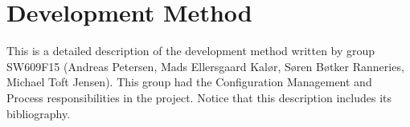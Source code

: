 \chapter{Development Method}\label{app:dev_method}

This is a detailed description of the \giraf development method written by group SW609F15 (Andreas Petersen, Mads Ellersgaard Kal\o r, S\o ren B\o tker Ranneries, Michael Toft Jensen). This group had the Configuration Management and Process responsibilities in the \giraf project. Notice that this description includes its bibliography.

